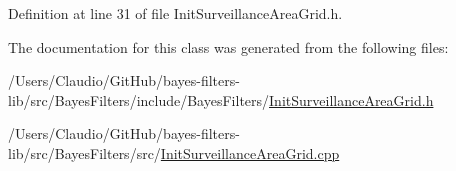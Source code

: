 Definition at line 31 of file Init\+Surveillance\+Area\+Grid.\+h.



The documentation for this class was generated from the following files\+:\begin{DoxyCompactItemize}
\item 
/\+Users/\+Claudio/\+Git\+Hub/bayes-\/filters-\/lib/src/\+Bayes\+Filters/include/\+Bayes\+Filters/\mbox{\hyperlink{InitSurveillanceAreaGrid_8h}{Init\+Surveillance\+Area\+Grid.\+h}}\item 
/\+Users/\+Claudio/\+Git\+Hub/bayes-\/filters-\/lib/src/\+Bayes\+Filters/src/\mbox{\hyperlink{InitSurveillanceAreaGrid_8cpp}{Init\+Surveillance\+Area\+Grid.\+cpp}}\end{DoxyCompactItemize}

